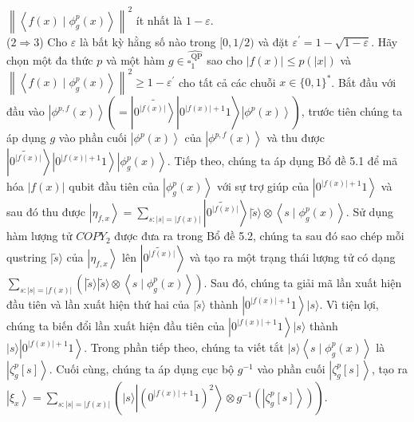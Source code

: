 \documentclass[10pt]{article}
\begin{document}
$\left\|\left\langle f(x) \mid \phi_{g}^{p}(x)\right\rangle\right\|^{2}$ ít nhất là $1-\varepsilon$.\\
($2 \Rightarrow 3$) Cho $\varepsilon$ là bất kỳ hằng số nào trong $[0,1 / 2)$ và đặt $\varepsilon^{\prime}=1-\sqrt{1-\varepsilon}$. Hãy chọn một đa thức $p$ và một hàm $g \in \widehat{\square_{1}^{\mathrm{QP}}}$ sao cho $|f(x)| \leq p(|x|)$ và $\left\|\left\langle f(x) \mid \phi_{g}^{p}(x)\right\rangle\right\|^{2} \geq 1-\varepsilon^{\prime}$ cho tất cả các chuỗi $x \in\{0,1\}^{*}$. Bắt đầu với đầu vào $\left.\left|\phi^{p, f}(x)\right\rangle\left(=\left|\widetilde{\left.0^{|f(x)|}\right\rangle}\right| 0^{|f(x)|+1} 1\right\rangle\left|\phi^{p}(x)\right\rangle\right)$, trước tiên chúng ta áp dụng $g$ vào phần cuối $\left|\phi^{p}(x)\right\rangle$ của $\left|\phi^{p, f}(x)\right\rangle$ và thu được $\left|\widetilde{0^{|f(x)|}}\right\rangle\left|0^{|f(x)|+1} 1\right\rangle\left|\phi_{g}^{p}(x)\right\rangle$. Tiếp theo, chúng ta áp dụng Bổ đề 5.1 để mã hóa $|f(x)|$ qubit đầu tiên của $\left|\phi_{g}^{p}(x)\right\rangle$ với sự trợ giúp của $\left|0^{|f(x)|+1} 1\right\rangle$ và sau đó thu được $\left|\eta_{f, x}\right\rangle=\sum_{s:|s|=|f(x)|}\left|\widetilde{0^{|f(x)|}}\right\rangle|\tilde{s}\rangle \otimes\left\langle s \mid \phi_{g}^{p}(x)\right\rangle$. Sử dụng hàm lượng tử $C O P Y_{2}$ được đưa ra trong Bổ đề 5.2, chúng ta sau đó sao chép mỗi qustring $|\tilde{s}\rangle$ của $\left|\eta_{f, x}\right\rangle$ lên $\left|\widetilde{0^{|f(x)|}}\right\rangle$ và tạo ra một trạng thái lượng tử có dạng $\sum_{s:|s|=|f(x)|}\left(|\tilde{s}\rangle|\tilde{s}\rangle \otimes\left\langle s \mid \phi_{g}^{p}(x)\right\rangle\right)$. Sau đó, chúng ta giải mã lần xuất hiện đầu tiên và lần xuất hiện thứ hai của $|\tilde{s}\rangle$ thành $\left|0^{|f(x)|+1} 1\right\rangle|s\rangle$. Vì tiện lợi, chúng ta biến đổi lần xuất hiện đầu tiên của $\left|0^{|f(x)|+1} 1\right\rangle|s\rangle$ thành $|s\rangle\left|0^{|f(x)|+1} 1\right\rangle$. Trong phần tiếp theo, chúng ta viết tắt $|s\rangle\left\langle s \mid \phi_{g}^{p}(x)\right\rangle$ là $\left|\zeta_{g}^{p}[s]\right\rangle$. Cuối cùng, chúng ta áp dụng cục bộ $g^{-1}$ vào phần cuối $\left|\zeta_{g}^{p}[s]\right\rangle$, tạo ra $\left|\xi_{x}\right\rangle=\sum_{s:|s|=|f(x)|}\left(|s\rangle\left|\left(0^{|f(x)|+1} 1\right)^{2}\right\rangle \otimes g^{-1}\left(\left|\zeta_{g}^{p}[s]\right\rangle\right)\right)$.
\end{document}
